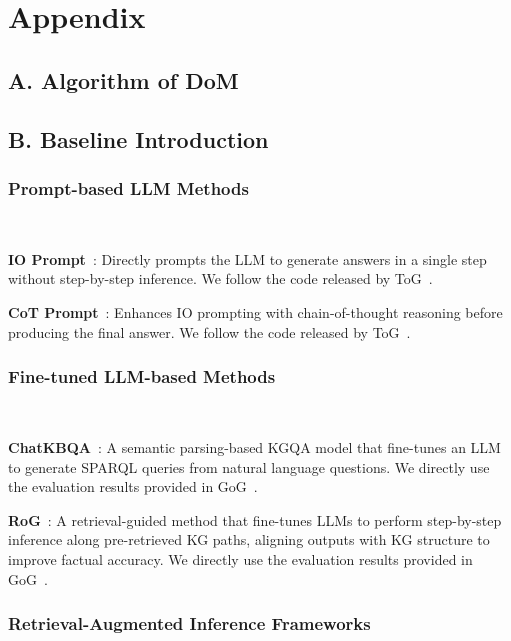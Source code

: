 \section{Appendix}

\subsection{A. Algorithm of DoM}




\subsection{B. Baseline Introduction}

\subsubsection{Prompt-based LLM Methods} \

\textbf{IO Prompt}~\cite{brown2020language}: Directly prompts the LLM to generate answers in a single step without step-by-step inference. We follow the code released by ToG~\cite{sun2023think}.

\textbf{CoT Prompt}~\cite{wei2022chain}: Enhances IO prompting with chain-of-thought reasoning before producing the final answer. We follow the code released by ToG~\cite{sun2023think}.

\subsubsection{Fine-tuned LLM-based Methods} \
~

\textbf{ChatKBQA}~\cite{luo2024chatkbqa}: A semantic parsing-based KGQA model that fine-tunes an LLM to generate SPARQL queries from natural language questions. We directly use the evaluation results provided in GoG~\cite{xu2024generate}.

\textbf{RoG}~\cite{luo2024reasoning}: A retrieval-guided method that fine-tunes LLMs to perform step-by-step inference along pre-retrieved KG paths, aligning outputs with KG structure to improve factual accuracy. We directly use the evaluation results provided in GoG~\cite{xu2024generate}.

\subsubsection{Retrieval-Augmented Inference Frameworks} \

